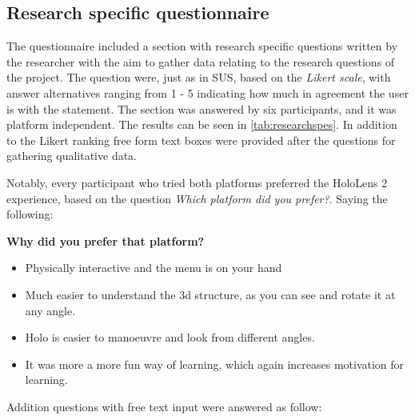 \subsection{Research specific questionnaire}\label{chap:researchspes}
The questionnaire included a section with research specific questions written by the researcher with the aim to gather data relating to the research questions of the project. The question were, just as in SUS, based on the \textit{Likert scale}, with answer alternatives ranging from 1 - 5 indicating how much in agreement the user is with the statement. The section was answered by six participants, and it was platform independent. The results can be seen in \autoref{tab:researchspes}. In addition to the Likert ranking free form text boxes were provided after the questions for gathering qualitative data. 


Notably, every participant who tried both platforms preferred the HoloLens 2 experience, based on the question \textit{Which platform did you prefer?}. Saying the following:
\newline

{\small
\noindent
\textbf{Why did you prefer that platform?}
\begin{itemize}[]
    \itshape\footnotesize
    \item Physically interactive and the menu is on your hand
    \item Much easier to understand the 3d structure, as you can see and rotate it at any angle.
    \item Holo is easier to manoeuvre and look from different angles.
    \item It was more a more fun way of learning, which again increases motivation for learning.
\end{itemize}
}
\noindent
Addition questions with free text input were answered as follow:
\newline

